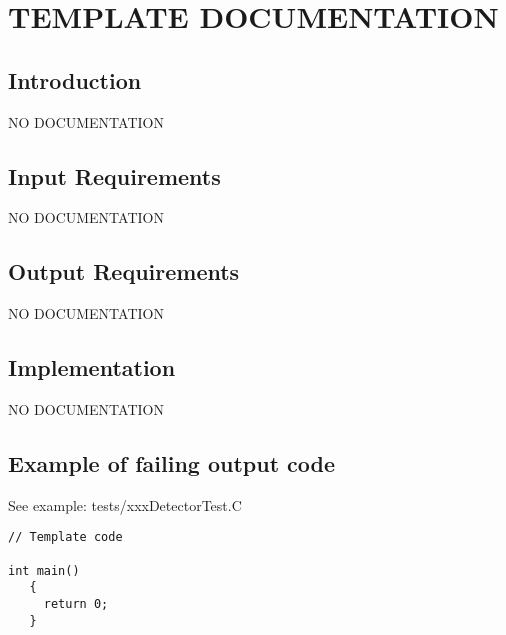 
\section{TEMPLATE DOCUMENTATION}

\label{template_checker::overview}

\subsection{Introduction}

NO DOCUMENTATION

\subsection{Input Requirements}

NO DOCUMENTATION

\subsection{Output Requirements}

NO DOCUMENTATION

\subsection{Implementation}

NO DOCUMENTATION

\subsection{Example of failing output code}
     See example: tests/xxxDetectorTest.C

{\mySmallFontSize
\begin{verbatim}
// Template code

int main()
   {
     return 0;
   }
\end{verbatim}
}

